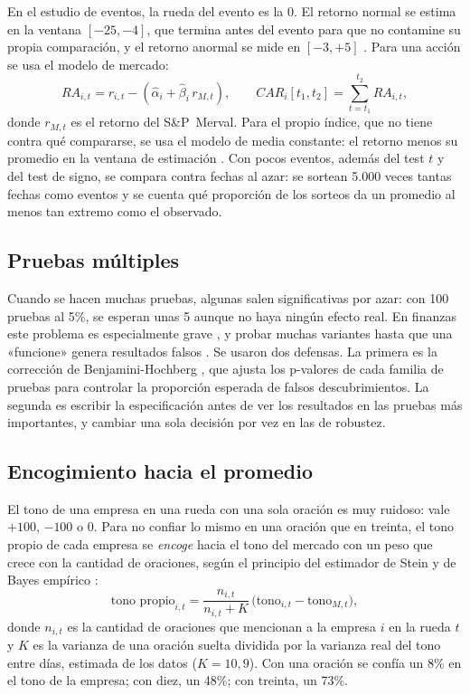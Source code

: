 En el estudio de eventos, la rueda del evento es la 0. El retorno normal se estima en la
ventana $[-25,-4]$, que termina antes del evento para que no contamine su propia comparación,
y el retorno anormal se mide en $[-3,+5]$ \citep{mackinlay1997}. Para una acción se usa el
modelo de mercado:
\begin{equation}
RA_{i,t} = r_{i,t} - \left(\hat\alpha_i + \hat\beta_i\, r_{M,t}\right),
\qquad CAR_i[t_1,t_2] = \sum_{t=t_1}^{t_2} RA_{i,t},
\end{equation}
donde $r_{M,t}$ es el retorno del S\&P~Merval. Para el propio índice, que no tiene contra qué
compararse, se usa el modelo de media constante: el retorno menos su promedio en la ventana de
estimación \citep{brown1985}. Con pocos eventos, además del test $t$ y del test de signo, se
compara contra fechas al azar: se sortean 5.000 veces tantas fechas como eventos y se cuenta
qué proporción de los sorteos da un promedio al menos tan extremo como el observado.

\subsection{Pruebas múltiples}

Cuando se hacen muchas pruebas, algunas salen significativas por azar: con 100 pruebas al
5\%, se esperan unas 5 aunque no haya ningún efecto real. En finanzas este problema es
especialmente grave \citep{harvey2016,harvey2020}, y probar muchas variantes hasta que una
«funcione» genera resultados falsos \citep{nikolopoulos2026}. Se usaron dos defensas. La
primera es la corrección de Benjamini-Hochberg \citep{bh1995}, que ajusta los p-valores de
cada familia de pruebas para controlar la proporción esperada de falsos descubrimientos. La
segunda es escribir la especificación antes de ver los resultados en las pruebas más
importantes, y cambiar una sola decisión por vez en las de robustez.

\subsection{Encogimiento hacia el promedio}

El tono de una empresa en una rueda con una sola oración es muy ruidoso: vale $+100$, $-100$
o 0. Para no confiar lo mismo en una oración que en treinta, el tono propio de cada empresa se
\textit{encoge} hacia el tono del mercado con un peso que crece con la cantidad de oraciones,
según el principio del estimador de Stein y de Bayes empírico \citep{efron1975}:
\begin{equation}
\text{tono propio}_{i,t} = \frac{n_{i,t}}{n_{i,t} + K}\,\bigl(\text{tono}_{i,t} - \text{tono}_{M,t}\bigr),
\end{equation}
donde $n_{i,t}$ es la cantidad de oraciones que mencionan a la empresa $i$ en la rueda $t$ y
$K$ es la varianza de una oración suelta dividida por la varianza real del tono entre días,
estimada de los datos ($K = 10{,}9$). Con una oración se confía un 8\% en el tono de la
empresa; con diez, un 48\%; con treinta, un 73\%.
